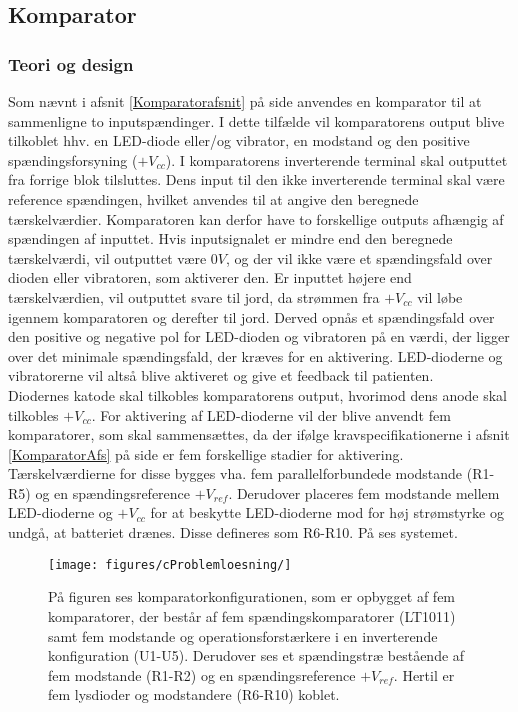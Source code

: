 \subsection{Komparator}
\subsubsection{Teori og design}
Som nævnt i afsnit \ref{Komparatorafsnit} på side \pageref{Komparatorafsnit} anvendes en komparator til at sammenligne to inputspændinger. I dette tilfælde vil komparatorens output blive tilkoblet hhv. en LED-diode eller/og vibrator, en modstand og den positive spændingsforsyning ($+V_{cc}$). I komparatorens inverterende terminal skal outputtet fra forrige blok tilsluttes. Dens input til den ikke inverterende terminal skal være reference spændingen, hvilket anvendes til at angive den beregnede tærskelværdier. Komparatoren kan derfor have to forskellige outputs afhængig af spændingen af inputtet. Hvis inputsignalet er mindre end den beregnede tærskelværdi, vil outputtet være $0V$, og der vil ikke være et spændingsfald over dioden eller vibratoren, som aktiverer den. Er inputtet højere end tærskelværdien, vil outputtet svare til jord, da strømmen fra $+V_{cc}$ vil løbe igennem komparatoren og derefter til jord. Derved opnås et spændingsfald over den positive og negative pol for LED-dioden og vibratoren på en værdi, der ligger over det minimale spændingsfald, der kræves for en aktivering. LED-dioderne og vibratorerne vil altså blive aktiveret og give et feedback til patienten. \\
Diodernes katode skal tilkobles komparatorens output, hvorimod dens anode skal tilkobles $+V_{cc}$. For aktivering af LED-dioderne vil der blive anvendt fem komparatorer, som skal sammensættes, da der ifølge kravspecifikationerne i afsnit \ref{KomparatorAfs} på side \pageref{KomparatorAfs} er fem forskellige stadier for aktivering. Tærskelværdierne for disse bygges vha. fem parallelforbundede modstande (R1-R5) og en spændingsreference $+V_{ref}$. Derudover placeres fem modstande mellem LED-dioderne og $+V_{cc}$ for at beskytte LED-dioderne mod for høj strømstyrke og undgå, at batteriet drænes. Disse defineres som R6-R10. På  ses systemet.\\

\begin{figure}[H]
	\centering 
	\texttt{[image: figures/cProblemloesning/]}
	\caption{På figuren ses komparatorkonfigurationen, som er opbygget af fem komparatorer, der består af fem spændingskomparatorer (LT1011) samt fem modstande og operationsforstærkere i en inverterende konfiguration (U1-U5). Derudover ses et spændingstræ bestående af fem modstande (R1-R2) og en spændingsreference $+V_{ref}$. Hertil er fem lysdioder og modstandere (R6-R10) koblet. }
	\label{Fig:grund_kompar}
\end{figure}

